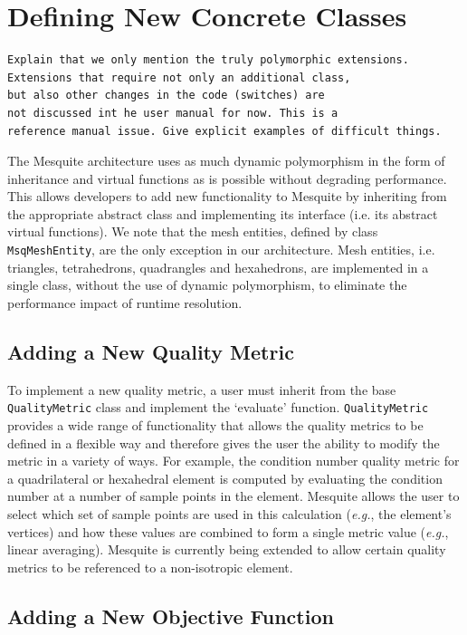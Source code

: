\documentclass[letter]{report}
\begin{document}
\section{Defining New Concrete Classes}

\begin{verbatim}
Explain that we only mention the truly polymorphic extensions. 
Extensions that require not only an additional class, 
but also other changes in the code (switches) are 
not discussed int he user manual for now. This is a 
reference manual issue. Give explicit examples of difficult things. 
\end{verbatim}

The Mesquite architecture uses as much dynamic polymorphism in the
form of inheritance and virtual functions as is possible without
degrading performance.  This allows developers to add new
functionality to Mesquite by inheriting from the appropriate abstract
class and implementing its interface (i.e. its abstract virtual
functions).  We note that the mesh entities, defined by class {\tt
MsqMeshEntity}, are the only exception in our architecture.  Mesh
entities, i.e. triangles, tetrahedrons, quadrangles and hexahedrons,
are implemented in a single class, without the use of dynamic
polymorphism, to eliminate the performance impact of runtime
resolution.

\subsection{Adding a New Quality Metric}

To implement a new quality metric, a user must inherit from the base
{\tt QualityMetric} class and implement the `evaluate' function.
{\tt QualityMetric} provides a wide range of
functionality that allows the quality metrics to be defined in a
flexible way and therefore gives the user the ability to modify the
metric in a variety of ways.  For example, the condition number
quality metric for a quadrilateral or hexahedral element is computed
by evaluating the condition number at a number of sample points in the
element.  Mesquite allows the user to select which set of sample
points are used in this calculation ({\it e.g.}, the element's
vertices) and how these values are combined to form a single metric
value ({\it e.g.}, linear averaging).  Mesquite is currently being
extended to allow certain quality metrics to be referenced to a
non-isotropic element.

\subsection{Adding a New Objective Function}
\end{document}
